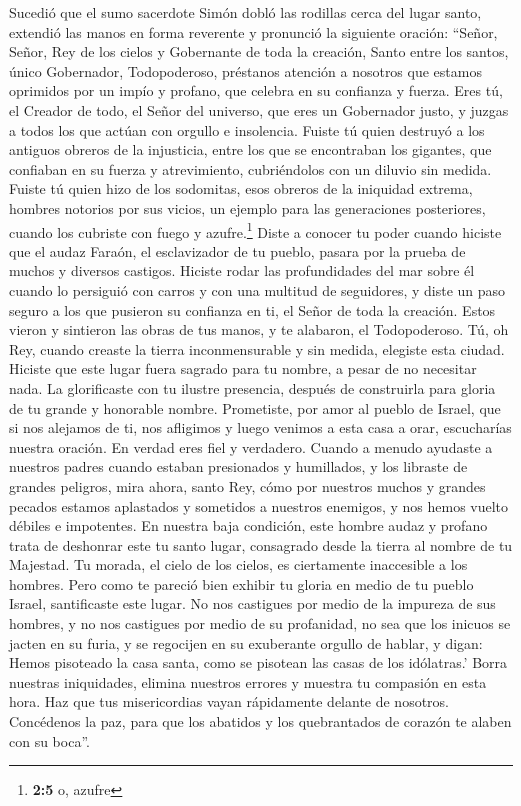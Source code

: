  Sucedió que el sumo sacerdote Simón dobló las rodillas
cerca del lugar santo, extendió las manos en forma reverente y pronunció
la siguiente oración:  ``Señor, Señor, Rey de los cielos y
Gobernante de toda la creación, Santo entre los santos, único
Gobernador, Todopoderoso, préstanos atención a nosotros que estamos
oprimidos por un impío y profano, que celebra en su confianza y fuerza.
 Eres tú, el Creador de todo, el Señor del universo, que
eres un Gobernador justo, y juzgas a todos los que actúan con orgullo e
insolencia.  Fuiste tú quien destruyó a los antiguos
obreros de la injusticia, entre los que se encontraban los gigantes, que
confiaban en su fuerza y atrevimiento, cubriéndolos con un diluvio sin
medida.  Fuiste tú quien hizo de los sodomitas, esos
obreros de la iniquidad extrema, hombres notorios por sus vicios, un
ejemplo para las generaciones posteriores, cuando los cubriste con fuego
y azufre.\footnote{\textbf{2:5} o, azufre}  Diste a
conocer tu poder cuando hiciste que el audaz Faraón, el esclavizador de
tu pueblo, pasara por la prueba de muchos y diversos castigos.
 Hiciste rodar las profundidades del mar sobre él cuando
lo persiguió con carros y con una multitud de seguidores, y diste un
paso seguro a los que pusieron su confianza en ti, el Señor de toda la
creación.  Estos vieron y sintieron las obras de tus
manos, y te alabaron, el Todopoderoso.  Tú, oh Rey, cuando
creaste la tierra inconmensurable y sin medida, elegiste esta ciudad.
Hiciste que este lugar fuera sagrado para tu nombre, a pesar de no
necesitar nada. La glorificaste con tu ilustre presencia, después de
construirla para gloria de tu grande y honorable nombre. 
Prometiste, por amor al pueblo de Israel, que si nos alejamos de ti, nos
afligimos y luego venimos a esta casa a orar, escucharías nuestra
oración.  En verdad eres fiel y verdadero.
 Cuando a menudo ayudaste a nuestros padres cuando
estaban presionados y humillados, y los libraste de grandes peligros,
 mira ahora, santo Rey, cómo por nuestros muchos y
grandes pecados estamos aplastados y sometidos a nuestros enemigos, y
nos hemos vuelto débiles e impotentes.  En nuestra baja
condición, este hombre audaz y profano trata de deshonrar este tu santo
lugar, consagrado desde la tierra al nombre de tu Majestad.
 Tu morada, el cielo de los cielos, es ciertamente
inaccesible a los hombres.  Pero como te pareció bien
exhibir tu gloria en medio de tu pueblo Israel, santificaste este lugar.
 No nos castigues por medio de la impureza de sus
hombres, y no nos castigues por medio de su profanidad, no sea que los
inicuos se jacten en su furia, y se regocijen en su exuberante orgullo
de hablar, y digan:  Hemos pisoteado la casa santa, como
se pisotean las casas de los idólatras.'  Borra nuestras
iniquidades, elimina nuestros errores y muestra tu compasión en esta
hora.  Haz que tus misericordias vayan rápidamente
delante de nosotros. Concédenos la paz, para que los abatidos y los
quebrantados de corazón te alaben con su boca''.

